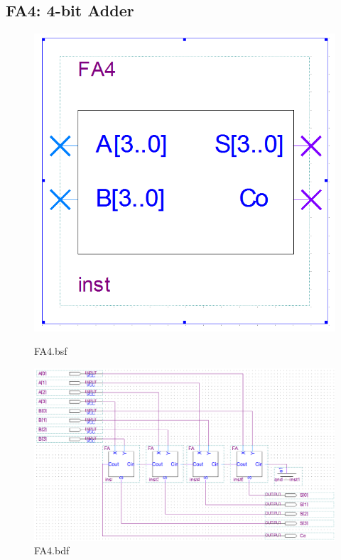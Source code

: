 \documentclass[12pt,a4paper]{article}
\begin{document}
  \subsection{FA4: 4-bit Adder}
  \begin{figure}[H]
    \centering
    \begin{subcaptionblock}{0.15\linewidth}
      \includegraphics[width=\linewidth]{Lab2_2/FA4_bsf.png}
      \caption{FA4.bsf}
    \end{subcaptionblock}
    \begin{subcaptionblock}{0.84\linewidth}
      \includegraphics[width=\linewidth]{Lab2_2/FA4_bdf.png}
      \caption{FA4.bdf}
    \end{subcaptionblock}
  \end{figure}
\end{document}
